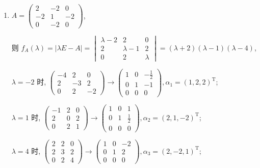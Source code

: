 	 \paragraph{} %
		 \begin{enumerate}
			 \item %
			       \( A = \begin{pmatrix}
				       2  & -2 & 0  \\
				       -2 & 1  & -2 \\
				       0  & -2 & 0
			       \end{pmatrix} \),

			       则 \( f_{A}(\lambda) = |\lambda E - A| = \begin{vmatrix}
				       \lambda - 2 & 2           & 0       \\
				       2           & \lambda - 1 & 2       \\
				       0           & 2           & \lambda
			       \end{vmatrix} = (\lambda + 2)(\lambda - 1)(\lambda - 4) \),

			       \( \lambda =-2 \) 时, \( \begin{pmatrix}
				       -4 & 2  & 0  \\
				       2  & -3 & 2  \\
				       0  & 2  & -2
			       \end{pmatrix} \rightarrow \begin{pmatrix}
				       1 & 0 & -\frac{1}{2} \\
				       0 & 1 & -1           \\
				       0 & 0 & 0
			       \end{pmatrix}, \alpha_{1} = (1, 2, 2)^{\mathrm{T}} \);

			       \( \lambda = 1 \) 时, \( \begin{pmatrix}
				       -1 & 2 & 0 \\
				       2  & 0 & 2 \\
				       0  & 2 & 1
			       \end{pmatrix} \rightarrow \begin{pmatrix}
				       1 & 0 & 1           \\
				       0 & 1 & \frac{1}{2} \\
				       0 & 0 & 0
			       \end{pmatrix} , \alpha_{2} = (2, 1, -2)^{\mathrm{T}} \);

			       \( \lambda = 4 \) 时, \( \begin{pmatrix}
				       2 & 2 & 0 \\
				       2 & 3 & 2 \\
				       0 & 2 & 4
			       \end{pmatrix} \rightarrow \begin{pmatrix}
				       1 & 0 & -2 \\
				       0 & 1 & 2  \\
				       0 & 0 & 0
			       \end{pmatrix} , \alpha_{3} = (2, -2, 1)^{\mathrm{T}} \);


\end{enumerate}

